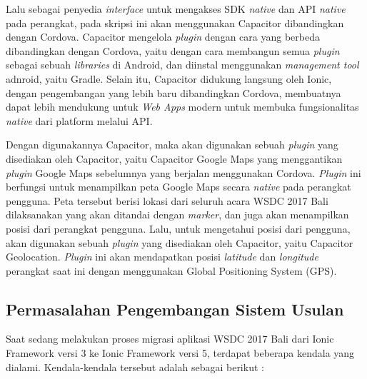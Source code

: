 \begin{itemize}
Lalu sebagai penyedia \textit{interface} untuk mengakses SDK \textit{native} dan API \textit{native} pada perangkat, pada skripsi ini akan menggunakan Capacitor dibandingkan dengan Cordova. Capacitor mengelola \textit{plugin} dengan cara yang berbeda dibandingkan dengan Cordova, yaitu dengan cara membangun semua \textit{plugin} sebagai sebuah \textit{libraries} di Android, dan diinstal menggunakan \textit{management tool} adnroid, yaitu Gradle. Selain itu, Capacitor didukung langsung oleh Ionic, dengan pengembangan yang lebih baru dibandingkan Cordova, membuatnya dapat lebih mendukung untuk \textit{Web Apps} modern untuk membuka fungsionalitas \textit{native} dari platform melalui API.

\newpage

Dengan digunakannya Capacitor, maka akan digunakan sebuah \textit{plugin} yang disediakan oleh Capacitor, yaitu Capacitor Google Maps yang menggantikan \textit{plugin} Google Maps sebelumnya yang berjalan menggunakan Cordova. \textit{Plugin} ini berfungsi untuk menampilkan peta Google Maps secara \textit{native} pada perangkat pengguna. Peta tersebut berisi lokasi dari seluruh acara WSDC 2017 Bali dilaksanakan yang akan ditandai dengan \textit{marker}, dan juga akan menampilkan posisi dari perangkat pengguna. Lalu, untuk mengetahui posisi dari pengguna, akan digunakan sebuah \textit{plugin} yang disediakan oleh Capacitor, yaitu Capacitor Geolocation. \textit{Plugin} ini akan mendapatkan posisi \textit{latitude} dan \textit{longitude} perangkat saat ini dengan menggunakan Global Positioning System (GPS). 
\end{itemize}

\subsection{Permasalahan Pengembangan Sistem Usulan}
\label{sec:analisisPermasalahanSistemKini}
Saat sedang melakukan proses migrasi aplikasi WSDC 2017 Bali dari Ionic Framework versi 3 ke Ionic Framework versi 5, terdapat beberapa kendala yang dialami. Kendala-kendala tersebut adalah sebagai berikut : 

